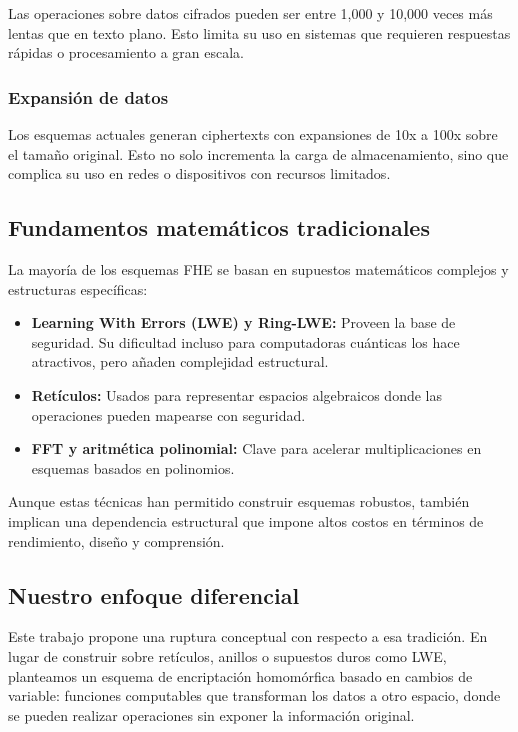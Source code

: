 \documentclass[11pt]{article}
\theoremstyle{plain}
\begin{document}
Las operaciones sobre datos cifrados pueden ser entre 1,000 y 10,000 veces más lentas que en texto plano. Esto limita su uso en sistemas que requieren respuestas rápidas o procesamiento a gran escala.

\subsubsection{Expansión de datos}

Los esquemas actuales generan ciphertexts con expansiones de 10x a 100x sobre el tamaño original. Esto no solo incrementa la carga de almacenamiento, sino que complica su uso en redes o dispositivos con recursos limitados.

\subsection{Fundamentos matemáticos tradicionales}

La mayoría de los esquemas FHE se basan en supuestos matemáticos complejos y estructuras específicas:

\begin{itemize}
    \item \textbf{Learning With Errors (LWE) y Ring-LWE:} Proveen la base de seguridad. Su dificultad incluso para computadoras cuánticas los hace atractivos, pero añaden complejidad estructural.
    \item \textbf{Retículos:} Usados para representar espacios algebraicos donde las operaciones pueden mapearse con seguridad.
    \item \textbf{FFT y aritmética polinomial:} Clave para acelerar multiplicaciones en esquemas basados en polinomios.
\end{itemize}

Aunque estas técnicas han permitido construir esquemas robustos, también implican una dependencia estructural que impone altos costos en términos de rendimiento, diseño y comprensión.

\subsection{Nuestro enfoque diferencial}

Este trabajo propone una ruptura conceptual con respecto a esa tradición. En lugar de construir sobre retículos, anillos o supuestos duros como LWE, planteamos un esquema de encriptación homomórfica basado en cambios de variable: funciones computables que transforman los datos a otro espacio, donde se pueden realizar operaciones sin exponer la información original.
\end{document}
